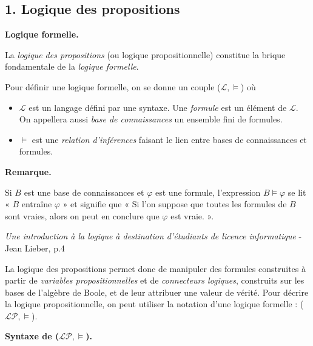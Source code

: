\documentclass[11pt]{article}
\newenvironment{remarque}{%
    \begin{mdframed}[
        linecolor=sectioncolor!40,
        linewidth=0.8pt,
        backgroundcolor=sectioncolor!5,
        innerleftmargin=10pt,
        innerrightmargin=10pt,
        innertopmargin=6pt,
        innerbottommargin=6pt,
        skipabove=8pt,
        skipbelow=8pt
    ]
    \noindent\textbf{\small\color{sectioncolor}Remarque.}\enspace\small\itshape
}{%
    \end{mdframed}
}
\begin{document}
\subsection*{1. Logique des propositions}
\label{lp}

\vspace{0.4cm}
\noindent\textbf{Logique formelle.}

\vspace{0.4cm}
La \textit{logique des propositions} (ou logique propositionnelle) constitue la brique fondamentale de la \textit{logique formelle}.

\vspace{0.2cm}

Pour définir une logique formelle, on se donne un couple ($\mathcal{L}, \models$) où

\begin{itemize}
    \item $\mathcal{L}$ est un langage défini par une syntaxe. Une \textit{formule} est un élément de $\mathcal{L}$. On appellera aussi \textit{base de connaissances} un ensemble fini de formules.
    \item $\models$ est une \textit{relation d'inférences} faisant le lien entre bases de connaissances et formules.
\end{itemize}

\begin{remarque}
    Si $B$ est une base de connaissances et $\varphi$ est une formule, l'expression $B \models \varphi$ se lit « $B$ entraîne $\varphi$ » et signifie que « Si l'on suppose que toutes les formules de $B$ sont vraies, alors on peut en conclure que $\varphi$ est vraie. ».
    
    \vspace{0.2cm}
    \noindent \emph{Une introduction à la logique à destination d'étudiants de licence informatique} - Jean Lieber, p.4
\end{remarque}


La logique des propositions permet donc de manipuler des formules construites à partir de \textit{variables
propositionnelles} et de \textit{connecteurs logiques}, construits sur les bases de l'algèbre de Boole, et de leur attribuer une valeur de
vérité. Pour décrire la logique propositionnelle, on peut utiliser la notation d'une logique formelle : ($\mathcal{L}\mathcal{P}, \models$).

\vspace{0.4cm}
\noindent\textbf{Syntaxe de ($\mathcal{L}\mathcal{P}, \models$).}
\end{document}
